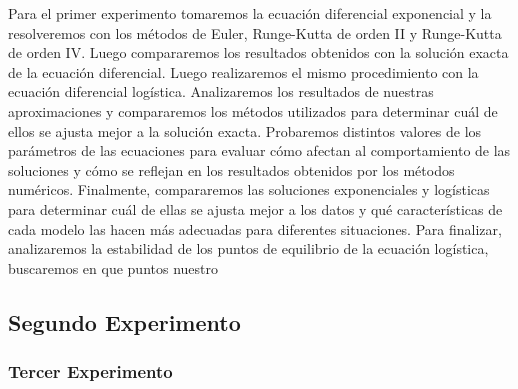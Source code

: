 \documentclass[12pt, letterpaper]{report}
\begin{document}
Para el primer experimento tomaremos la ecuación diferencial exponencial y la resolveremos con los métodos de Euler, Runge-Kutta de orden II y Runge-Kutta de orden IV. Luego compararemos los resultados obtenidos con la solución exacta de la ecuación diferencial.
Luego realizaremos el mismo procedimiento con la ecuación diferencial logística.
Analizaremos los resultados de nuestras aproximaciones y compararemos los métodos utilizados para determinar cuál de ellos se ajusta mejor a la solución exacta.
Probaremos distintos valores de los parámetros de las ecuaciones para evaluar cómo afectan al comportamiento de las soluciones y cómo se reflejan en los resultados obtenidos por los métodos numéricos.
Finalmente, compararemos las soluciones exponenciales y logísticas para determinar cuál de ellas se ajusta mejor a los datos y qué características de cada modelo las hacen más adecuadas para diferentes situaciones.
Para finalizar, analizaremos la estabilidad de los puntos de equilibrio de la ecuación logística, buscaremos en que puntos nuestro
\subsection*{Segundo Experimento}%
\subsubsection*{Tercer Experimento}%
\end{document}
